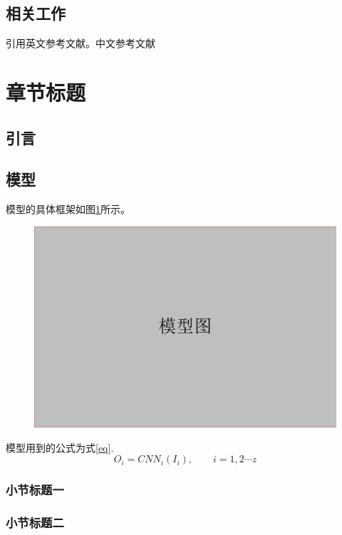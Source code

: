 \documentclass{ctexart}
\numberwithin{figure}{section}
\numberwithin{table}{section}
\numberwithin{equation}{section}
\begin{document}
\subsection{相关工作}
引用英文参考文献。中文参考文献

\newpage
\section{章节标题}
\subsection{引言}

\subsection{模型}
模型的具体框架如图\ref{model_structure}所示。
\begin{figure}[htbp]
	\centering
	\includegraphics[width=\textwidth]{模型图.pdf}
	\label{model_structure}
\end{figure}

模型用到的公式为式\ref{eq}.
\begin{equation}
	O_{i}=CNN_{i}(I_{i}),\qquad i=1,2\cdots z
	\label{eq}
\end{equation}

\subsubsection{小节标题一}

\subsubsection{小节标题二}
\end{document}
